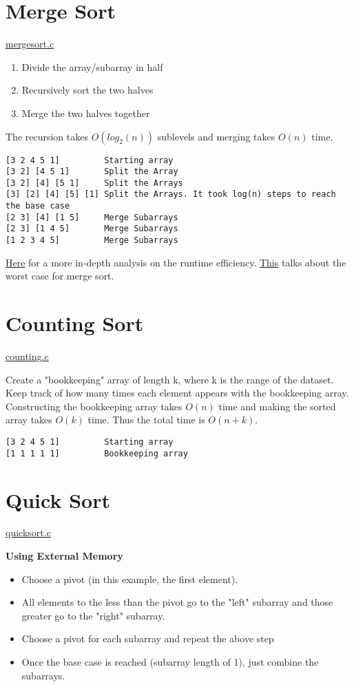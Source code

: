 \documentclass{article}
\begin{document}
\section{Merge Sort}
\href{algos/mergesort.c}{mergesort.c} 

\begin{enumerate}
\item Divide the array/subarray in half 
\item Recursively sort the two halves
\item Merge the two halves together
\end{enumerate}
The recursion takes $O(log_2(n))$ sublevels and merging takes $O(n)$ time.
\begin{lstlisting}
[3 2 4 5 1]         Starting array
[3 2] [4 5 1]       Split the Array
[3 2] [4] [5 1]     Split the Arrays
[3] [2] [4] [5] [1] Split the Arrays. It took log(n) steps to reach the base case
[2 3] [4] [1 5]     Merge Subarrays
[2 3] [1 4 5]       Merge Subarrays
[1 2 3 4 5]         Merge Subarrays
\end{lstlisting}
\href{https://youtu.be/alJswNJ4P3U}{Here} for a more in-depth analysis on the runtime efficiency.
\href{https://stackoverflow.com/q/24594112/9512643}{This} talks about the worst case for merge sort.

\section{Counting Sort}
\href{algos/counting.c}{counting.c} \newline

Create a "bookkeeping" array of length k, where k is the range of the dataset.
Keep track of how many times each element appears with the bookkeeping array.
Constructing the bookkeeping array takes $O(n)$ time and making the sorted array takes $O(k)$ time.
Thus the total time is $O(n + k)$.
\begin{lstlisting}
[3 2 4 5 1]         Starting array
[1 1 1 1 1]         Bookkeeping array
\end{lstlisting}

\section{Quick Sort}
\href{algos/quicksort.c}{quicksort.c} \newline

\textbf{Using External Memory}
\begin{itemize}
\item Choose a pivot (in this example, the first element). 
\item All elements to the less than the pivot go to the "left" subarray and those greater go to the "right" subarray.
\item Choose a pivot for each subarray and repeat the above step
\item Once the base case is reached (subarray length of 1), just combine the subarrays. \newline
\end{itemize}
\end{document}
